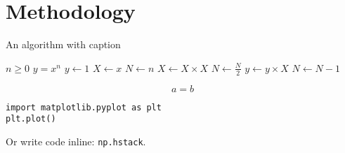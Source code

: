 \chapter{Methodology}
\label{chap:methodology}



\begin{algorithm}
\caption{An algorithm with caption}\label{alg:cap}
\begin{algorithmic}
\Require $n \geq 0$
\Ensure $y = x^n$
\State $y \gets 1$
\State $X \gets x$
\State $N \gets n$
    \State $X \gets X \times X$
    \State $N \gets \frac{N}{2}$  
    \State $y \gets y \times X$
    \State $N \gets N - 1$
\EndIf
\EndWhile
\end{algorithmic}
\end{algorithm}

\begin{equation}\label{eq:Eq1}
   a=b
\end{equation}


\begin{verbatim}
import matplotlib.pyplot as plt
plt.plot()
\end{verbatim}
Or write code inline: \texttt{np.hstack}.